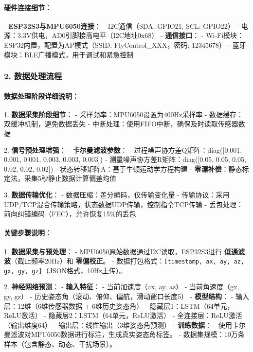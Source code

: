 \documentclass[12pt, a4paper]{article}
\begin{document}
\paragraph{硬件连接细节：}
- \textbf{ESP32S3与MPU6050连接}：
  - I2C通信（SDA: GPIO21, SCL: GPIO22）
  - 电源：3.3V供电，AD0引脚接高电平（I2C地址0x68）
- \textbf{通信接口}：
  - Wi-Fi模块：ESP32内置，配置为AP模式（SSID: FlyControl\_XXX，密码: 12345678）
  - 蓝牙模块：BLE广播模式，用于调试和紧急控制

\subsubsection{2. 数据处理流程}

\begin{center}
\end{center}

\paragraph{数据处理阶段详细说明：}

1. \textbf{数据采集阶段细节}：
   - 采样频率：MPU6050设置为400Hz采样率
   - 数据缓存：双缓冲机制，避免数据丢失
   - 中断处理：使用FIFO中断，确保及时读取传感器数据

2. \textbf{信号预处理增强}：
   - \textbf{卡尔曼滤波参数}：
     - 过程噪声协方差Q矩阵：diag([0.001, 0.001, 0.001, 0.003, 0.003, 0.003])
     - 测量噪声协方差R矩阵：diag([0.05, 0.05, 0.05, 0.02, 0.02, 0.02])
     - 状态转移矩阵A：基于牛顿运动学方程构建
   - \textbf{零漂补偿}：静态标定法，采集5秒静止数据计算偏差均值

3. \textbf{数据传输优化}：
   - 数据压缩：差分编码，仅传输变化量
   - 传输协议：采用UDP/TCP混合传输策略，状态数据UDP传输，控制指令TCP传输
   - 丢包处理：前向纠错编码（FEC），允许恢复15\%的丢包

\paragraph{关键步骤说明：}
1. \textbf{数据采集与预处理}：
   - MPU6050原始数据通过I2C读取，ESP32S3进行 \textbf{低通滤波}（截止频率20Hz）和 \textbf{零偏校正}。
   - 数据打包格式：\texttt{[timestamp, ax, ay, az, gx, gy, gz]}（JSON格式，10Hz上传）。

2. \textbf{神经网络预测}：
   - \textbf{输入特征}：
     - 当前加速度（ax, ay, az）
     - 当前角速度（gx, gy, gz）
     - 历史姿态角（滚动、俯仰、偏航，滑动窗口长度5）
   - \textbf{模型结构}：
     - 输入层：12维（6维传感器数据 + 6维历史姿态角）
     - 隐藏层1：LSTM（64单元，ReLU激活）
     - 隐藏层2：LSTM（64单元，ReLU激活）
     - 全连接层：ReLU激活（输出维度64）
     - 输出层：线性输出（3维姿态角预测）
   - \textbf{训练数据}：
     - 使用卡尔曼滤波对MPU6050数据进行标注，生成真实姿态角标签。
     - 数据集规模：10万条样本（包含静态、动态、干扰场景）。
\end{document}
